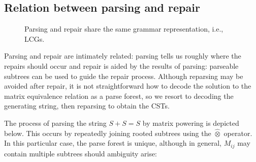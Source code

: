 \documentclass[sigplan,review,anonymous,acmsmall]{acmart}\settopmatter{printfolios=false,printccs=false,printacmref=false}
\begin{document}
\subsection{Relation between parsing and repair}\label{sec:sat}

\begin{figure}
  \vspace{-20pt}
  \resizebox{.4\textwidth}{!}{}
  \caption{Parsing and repair share the same grammar representation, i.e., LCGs.}
\end{figure}

Parsing and repair are intimately related: parsing tells us roughly where the repairs should occur and repair is aided by the results of parsing: parseable subtrees can be used to guide the repair process. Although reparsing may be avoided after repair, it is not straightforward how to decode the solution to the matrix equivalence relation as a parse forest, so we resort to decoding the generating string, then reparsing to obtain the CSTs.



The process of parsing the string $S + S = S$ by matrix powering is depicted below. This occurs by repeatedly joining rooted subtrees using the $\hat{\otimes}$ operator. In this particular case, the parse forest is unique, although in general, $M_{ij}$ may contain multiple subtrees should ambiguity arise:
\end{document}
